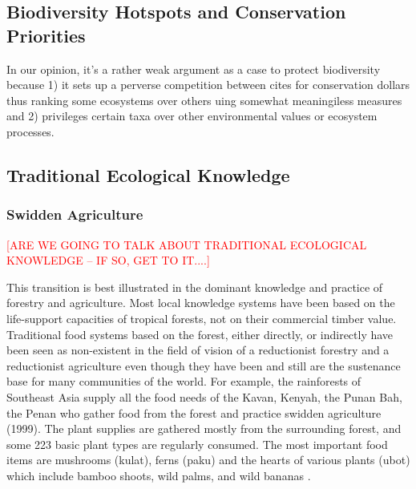 \subsection{Biodiversity Hotspots and Conservation Priorities}  

In our opinion, it's a rather weak argument as a case to protect biodiversity because 1) it sets up a perverse competition between cites for conservation dollars thus ranking some ecosystems over others uing somewhat meaningiless measures and 2) privileges certain taxa over other environmental values or ecosystem processes.

\subsection{Traditional Ecological Knowledge}

\subsubsection{Swidden Agriculture}

\textcolor{red}{[ARE WE GOING TO TALK ABOUT TRADITIONAL ECOLOGICAL KNOWLEDGE -- IF SO, GET TO IT....]}

This transition is best illustrated in the dominant knowledge and practice of forestry and agriculture. Most local knowledge systems have been based on the life-support capacities of tropical forests, not on their commercial timber value. Traditional food systems based on the forest, either directly, or indirectly have been seen as non-existent in the field of vision of a reductionist forestry and a reductionist agriculture even though they have been and still are the sustenance base for many communities of the world. For example, the rainforests of Southeast Asia supply all the food needs of the Kavan, Kenyah, the Punan Bah, the Penan who gather food from the forest and practice swidden agriculture (1999). The plant supplies are gathered mostly from the surrounding forest, and some 223 basic plant types are regularly consumed. The most important food items are mushrooms (kulat), ferns (paku) and the hearts of various plants (ubot) which include bamboo shoots, wild palms, and wild bananas \citep{hong1987natives}.


